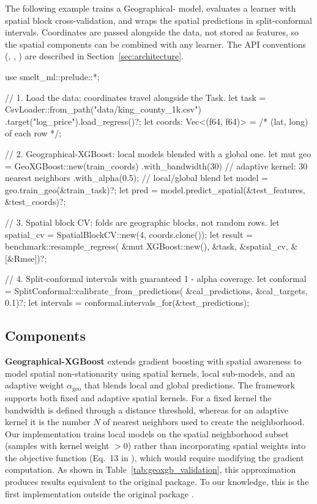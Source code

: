 \documentclass[article]{jss}
\begin{document}
The following example trains a Geographical- model, evaluates a
learner with spatial block cross-validation, and wraps the spatial predictions
in split-conformal intervals. Coordinates are passed alongside the data, not
stored as features, so the spatial components can be combined with any
learner. The API conventions (, , )
are described in Section~\ref{sec:architecture}.

\begin{CodeChunk}
\begin{CodeInput}
use smelt_ml::prelude::*;

// 1. Load the data; coordinates travel alongside the Task.
let task = CsvLoader::from_path("data/king_county_1k.csv")
    .target("log_price").load_regress()?;
let coords: Vec<(f64, f64)> = /* (lat, long) of each row */;

// 2. Geographical-XGBoost: local models blended with a global one.
let mut geo = GeoXGBoost::new(train_coords)
    .with_bandwidth(30)   // adaptive kernel: 30 nearest neighbors
    .with_alpha(0.5);     // local/global blend
let model = geo.train_geo(&train_task)?;
let pred = model.predict_spatial(&test_features, &test_coords)?;

// 3. Spatial block CV: folds are geographic blocks, not random rows.
let spatial_cv = SpatialBlockCV::new(4, coords.clone());
let result = benchmark::resample_regress(
    &mut XGBoost::new(), &task, &spatial_cv, &[&Rmse])?;

// 4. Split-conformal intervals with guaranteed 1 - alpha coverage.
let conformal = SplitConformal::calibrate_from_predictions(
    &cal_predictions, &cal_targets, 0.1)?;
let intervals = conformal.intervals_for(&test_predictions);
\end{CodeInput}
\end{CodeChunk}

\subsection{Components}

\textbf{Geographical-XGBoost} \citep{Grekousis:2025} extends gradient boosting
with spatial awareness to model spatial non-stationarity using spatial kernels,
local sub-models, and an adaptive weight $\alpha_{\mathrm{geo}}$ that blends
local and global predictions. The framework supports both fixed and adaptive
spatial kernels. For a fixed kernel the bandwidth is defined through a distance
threshold, whereas for an adaptive kernel it is the number $N$ of nearest
neighbors used to create the neighborhood. Our implementation trains local
models on the spatial neighborhood subset (samples with kernel weight $> 0$)
rather than incorporating spatial weights into the  objective
function (Eq.~13 in \citealp{Grekousis:2025}), which would require modifying the
gradient computation. As shown in Table~\ref{tab:geoxgb_validation}, this
approximation produces results equivalent to the original package. To our
knowledge, this is the first implementation outside the original
 package \citep{geoxgboost:2024}.
\end{document}
